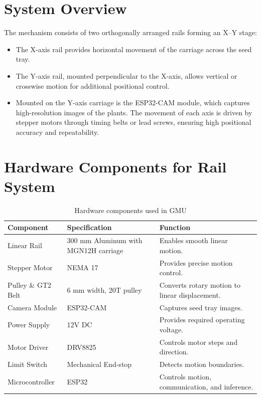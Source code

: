 \documentclass[../main]{subfiles}
\begin{document}
\section{System Overview}
The mechanism consists of two orthogonally arranged rails forming an X–Y stage:
\begin{itemize}
    \item The X-axis rail provides horizontal movement of the carriage across the seed tray.
    \item The Y-axis rail, mounted perpendicular to the X-axis, allows vertical or crosswise motion for additional positional control.
    \item Mounted on the Y-axis carriage is the ESP32-CAM module, which captures high-resolution images of the plants.
The movement of each axis is driven by stepper motors through timing belts or lead screws, ensuring high positional accuracy and repeatability.

\end{itemize}
\section{Hardware Components for Rail System}

\begin{table}[H]
    \centering
    \begin{tabularx} {\textwidth} {
            >{\raggedright}p{3.5cm}
            >{\raggedright}X
            >{\raggedright\arraybackslash}p{6cm}
        }
        \toprule
        \textbf{Component} & \textbf{Specification} & \textbf{Function} \\ \midrule
        Linear Rail & 300 mm Aluminum with MGN12H carriage & Enables smooth linear motion. \\
        Stepper Motor & NEMA 17 & Provides precise motion control. \\
        Pulley \& GT2 Belt & 6 mm width, 20T pulley & Converts rotary motion to linear displacement. \\
        Camera Module & ESP32-CAM & Captures seed tray images. \\
        Power Supply & 12V DC & Provides required operating voltage. \\
        Motor Driver & DRV8825 & Controls motor steps and direction. \\
        Limit Switch & Mechanical End-stop & Detects motion boundaries. \\
        Microcontroller & ESP32 & Controls motion, communication, and inference. \\
        \bottomrule
    \end{tabularx}
    \caption{Hardware components used in GMU}
\end{table}
\end{document}
